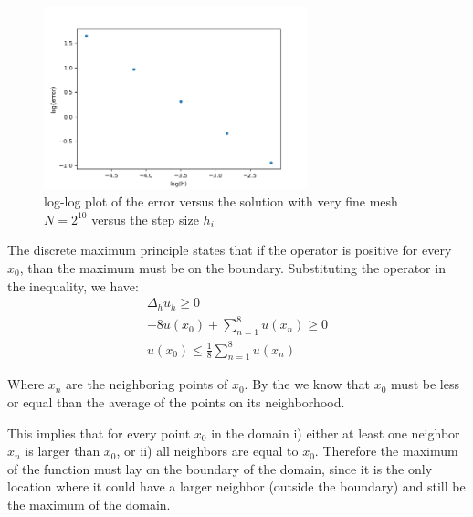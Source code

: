 \begin{figure}[H]
	\centering
	\includegraphics[width=0.68\textwidth]{Documentation/Figures/a05ex02d_error.png} 
	\caption{log-log plot of the error versus the solution with very fine mesh $N=2^10$ versus the step size $h_i$ }
	\label{fig:a05ex01domain2}
\end{figure}



%
%
The discrete maximum principle states that if the operator is positive for every $x_0$, than the maximum must be on the boundary. Substituting the operator in the inequality, we have:
\begin{gather}
    \Delta_h u_h \ge 0 \nonumber\\
    -8 u(x_0) + \sum_{n=1}^{8} u(x_n) \ge 0 \nonumber\\
    u(x_0) \le  \frac{1}{8} \sum_{n=1}^{8} u(x_n)
    \label{e3eq1}
\end{gather}

Where $x_n$ are the neighboring points of $x_0$. By the  we know that $x_0$ must be less or equal than the average of the points on its neighborhood.

This implies that for every point $x_0$ in the domain i) either at least one neighbor $x_n$ is larger than $x_0$, or ii)  all neighbors are equal to $x_0$. Therefore the maximum of the function must lay on the boundary of the domain, since it is the only location where it could have a larger neighbor (outside the boundary) and still be the maximum of the domain.
%

%
%
